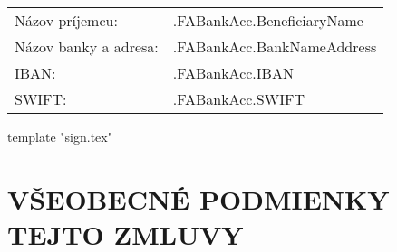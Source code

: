 \documentclass[a4paper]{article}
\begin{document}
\begin{enumerate}
    \begin{tabu}{XX[2]}
        Názov príjemcu: 	& 	{{.FABankAcc.BeneficiaryName}} 	\\
        Názov banky a adresa:  	& 	{{.FABankAcc.BankNameAddress}} 	\\
        IBAN:			& 	{{.FABankAcc.IBAN}} 		\\
        SWIFT:			& 	{{.FABankAcc.SWIFT}} 		\\
    \end{tabu}

\end{enumerate}

{{template "sign.tex"}}

\section{VŠEOBECNÉ PODMIENKY TEJTO ZMLUVY}
\end{document}
